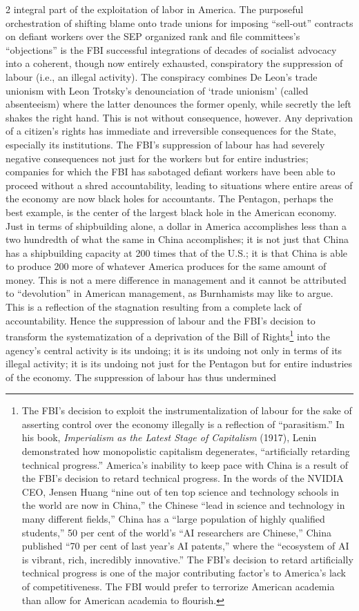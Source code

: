 \documentclass[10pt,a4paper,twoside]{article} %
\begin{document}
\begin{multicols}{2}
{integral part of the exploitation of labor in America. The purposeful orchestration of shifting blame onto trade unions for imposing “sell-out” contracts on defiant workers over the SEP organized rank and file committees’s “objections” is the FBI successful integrations of decades of socialist advocacy into a coherent, though now entirely exhausted, conspiratory the suppression of labour (i.e., an illegal activity). The conspiracy combines De Leon’s trade unionism with Leon Trotsky’s denounciation of ‘trade unionism’ (called absenteeism) where the latter denounces the former openly, while secretly the left shakes the right hand. This is not without consequence, however. Any deprivation of a citizen’s rights has immediate and irreversible consequences for the State, especially its institutions. The FBI’s suppression of labour has had severely negative consequences not just for the workers but for entire industries; companies for which the FBI has sabotaged defiant workers have been able to proceed without a shred accountability, leading to situations where entire areas of the economy are now black holes for accountants. The Pentagon, perhaps the best example, is the center of the largest black hole in the American economy. Just in terms of shipbuilding alone, a dollar in America accomplishes less than a two hundredth of what the same in China accomplishes; it is not just that China has a shipbuilding capacity at 200 times that of the U.S.; it is that China is able to produce 200 more of whatever America produces for the same amount of money. This is not a mere difference in management and it cannot be attributed to “devolution” in American management, as Burnhamists may like to argue. This is a reflection of the stagnation resulting from a complete lack of accountability. Hence the suppression of labour and the FBI’s decision to transform the systematization of a deprivation of the Bill of Rights\footnote{The FBI’s decision to exploit the instrumentalization of labour for the sake of asserting control over the economy illegally is a reflection of “parasitism.” In his book, \emph{Imperialism as the Latest Stage of Capitalism} (1917), Lenin demonstrated how monopolistic capitalism degenerates, “artificially retarding technical progress.” America’s inability to keep pace with China is a result of the FBI’s decision to retard technical progress. In the words of the NVIDIA CEO,  Jensen Huang “nine out of ten top science and technology schools in the world are now in China,” the Chinese “lead in science and technology in many different fields,” China has a “large population of highly qualified students,” 50 per cent of the world’s “AI researchers are Chinese,” China published “70 per cent of last year’s AI patents,” where the “ecosystem of AI is vibrant, rich, incredibly innovative.” The FBI’s decision to retard artificially technical progress is one of the major contributing factor’s to America’s lack of competitiveness. The FBI would prefer to terrorize American academia than allow for American academia to flourish.} into the agency’s central activity is its undoing; it is its undoing not only in terms of its illegal activity; it is its undoing not just for the Pentagon but for entire industries of the economy. The suppression of labour has thus undermined }
\end{multicols}
\end{document}
